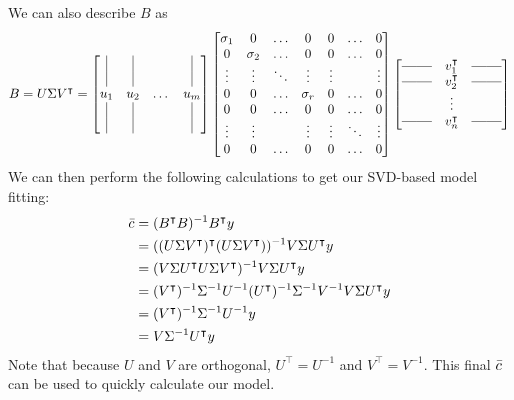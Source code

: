 \documentclass{article}%
\begin{document}
We can also describe $B$ as
\[
B = U \Sigma V^\intercal = \begin{bmatrix}
    \vline & \vline & & \vline \\
    \vline & \vline & & \vline \\
    u_1 & u_2 & \dots & u_m\\
     \vline & \vline & & \vline \\
     \vline & \vline & & \vline \\
\end{bmatrix} \begin{bmatrix}
    \sigma_1 & 0 & \hdots & 0 & 0 & \hdots & 0\\
    0 & \sigma_2 & \hdots & 0 & 0 & \hdots & 0\\
    \vdots & \vdots & \ddots & \vdots & \vdots& & \vdots \\
    0 & 0 & \hdots & \sigma_r & 0 & \hdots & 0\\
    0 & 0 & \hdots & 0 & 0 & \hdots & 0\\
    \vdots & \vdots & & \vdots & \vdots &\ddots & \vdots\\
    0 & 0 & \hdots & 0 & 0 & \hdots & 0
\end{bmatrix} \begin{bmatrix}
    \textbf{------} & v_1^\intercal & \textbf{------}\\
        \textbf{------} & v_2^\intercal & \textbf{------}
\\     & \vdots & 
\\   \textbf{------} & v_n^\intercal & \textbf{------}

\end{bmatrix}
\]
We can then perform the following calculations to get our SVD-based model fitting:
\begin{align*}
    \Bar{c} &= (B^\intercal B)^{-1} B^\intercal y \\
    &= ((U \Sigma V^\intercal)^\intercal (U \Sigma V^\intercal))^{-1} V \Sigma U^\intercal y\\
    &= (V \Sigma U^\intercal U \Sigma V^\intercal)^{-1} V \Sigma U^\intercal y\\
    &= (V^\intercal)^{-1} \Sigma^{-1} U^{-1} (U^\intercal)^{-1} \Sigma^{-1} V^{-1} V \Sigma U^\intercal y\\
    &= (V^\intercal)^{-1} \Sigma^{-1} U^{-1} y\\
    &= V \Sigma^{-1} U^\intercal y
\end{align*}
Note that because $U$ and $V$ are orthogonal, $U^\intercal=U^{-1}$ and $V^\intercal=V^{-1}$. This final $\Bar{c}$ can be used to quickly calculate our model.
\end{document}
